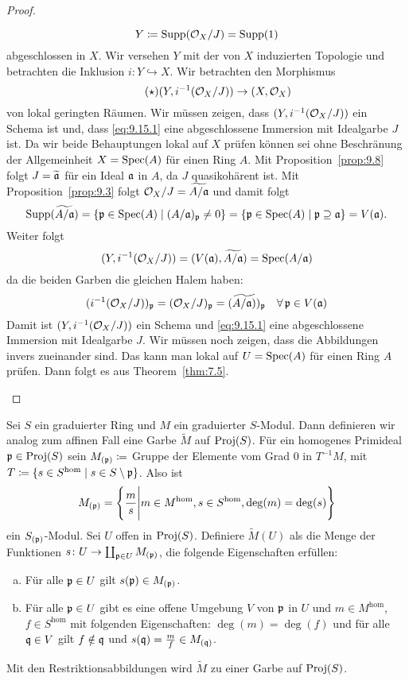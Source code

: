 \begin{prop}
\begin{proof}
\begin{enumerate}[i)]
 			\[
 				Y \coloneqq \operatorname{Supp}(\mathcal{O}_X/J) = \operatorname{Supp}(1)
 			\]
 			abgeschlossen in $X$. Wir versehen $Y$ mit der von $X$ induzierten Topologie und betrachten die Inklusion $i\colon Y \hookrightarrow X$. Wir betrachten den Morphismus
 			\[
 			\label{eq:9.15.1}\tag{$\star$}
 				(Y,i^{-1}(\mathcal{O}_X/J)) \to (X,\mathcal{O}_X)
 			\]
 			von lokal geringten Räumen. Wir müssen zeigen, dass $(Y,i^{-1}(\mathcal{O}_X/J))$ ein Schema ist und, dass \eqref{eq:9.15.1} eine abgeschlossene Immersion mit Idealgarbe $J$ ist. Da wir beide Behauptungen lokal auf $X$ prüfen können sei ohne Beschränung der Allgemeinheit $X = \operatorname{Spec}(A)$ für einen Ring $A$. Mit Proposition~\ref{prop:9.8} folgt $J = \widetilde{\mathfrak{a}}$ für ein Ideal $\mathfrak{a}$ in $A$, da $J$ quasikohärent ist. Mit Proposition~\ref{prop:9.3} folgt $\mathcal{O}_X/J = \widetilde{A/\mathfrak{a}}$ und damit folgt
 			\[
 				\operatorname{Supp}(\widetilde{A/\mathfrak{a}}) = \{\mathfrak{p} \in \operatorname{Spec}(A) \mid (A/\mathfrak{a})_{\mathfrak{p}} \neq 0\} = \{\mathfrak{p} \in \operatorname{Spec}(A) \mid \mathfrak{p} \supseteq \mathfrak{a}\} = V(\mathfrak{a}).
 			\]
 			Weiter folgt
 			\[
 				(Y,i^{-1}(\mathcal{O}_X/J)) = (V(\mathfrak{a}),\widetilde{A/\mathfrak{a}}) = \operatorname{Spec}(A/\mathfrak{a})
 			\]
 			da die beiden Garben die gleichen Halem haben:
 			\[
 				(i^{-1}(\mathcal{O}_X/J))_{\mathfrak{p}} = (\mathcal{O}_X/J)_{\mathfrak{p}} = (\widetilde{A/\mathfrak{a})})_{\mathfrak{p}}\quad \forall\, \mathfrak{p} \in V(\mathfrak{a})
 			\]
 			Damit ist $(Y,i^{-1}(\mathcal{O}_X/J))$ ein Schema und \eqref{eq:9.15.1} eine abgeschlossene Immersion mit Idealgarbe $J$. Wir müssen noch zeigen, dass die Abbildungen invers zueinander sind. Das kann man lokal auf $U=\operatorname{Spec}(A)$ für einen Ring $A$ prüfen. Dann folgt es aus Theorem~\ref{thm:7.5}.
 		\end{enumerate}
 	\end{proof}
\end{prop}

\begin{defn}
\label{defn:9.16}
	Sei $S$ ein graduierter Ring und $M$ ein graduierter $S$-Modul. Dann definieren wir analog zum affinen Fall eine Garbe $\widetilde{M}$ auf $\operatorname{Proj}(S)$. Für ein homogenes Primideal $\mathfrak{p} \in \operatorname{Proj}(S)$ sein $M_{(\mathfrak{p})}\coloneqq$ Gruppe der Elemente vom Grad $0$ in $T^{-1}M$, mit $T\coloneqq \{s \in S^\text{hom}\mid s \in S \setminus \mathfrak{p}\}$. Also ist
	\[
		M_{(\mathfrak{p})} = \Bigg\lbrace \frac{m}{s} \Bigg\vert m \in M^{\text{hom}}, s \in S^{\text{hom}}, \deg(m) = \deg(s) \Bigg\rbrace
	\]
	ein $S_{(\mathfrak{p})}$-Modul. Sei $U$ offen in $\operatorname{Proj}(S)$. Definiere $\widetilde{M}(U)$ als die Menge der Funktionen $s\colon U \to \coprod_{\mathfrak{p} \in U}M_{(\mathfrak{p})}$, die folgende Eigenschaften erfüllen:
	\begin{enumerate}[a)]
		\item Für alle $\mathfrak{p} \in U$ gilt $s(\mathfrak{p}) \in M_{(\mathfrak{p})}$.
		\item Für alle $\mathfrak{p} \in U$ gibt es eine offene Umgebung $V$ von $\mathfrak{p}$ in $U$ und $m \in M^{\text{hom}}$, $f\in S^{\text{hom}}$ mit folgenden Eigenschaften: $\deg(m)=\deg(f)$ und für alle $\mathfrak{q} \in V$ gilt $f \notin \mathfrak{q}$ und $s(\mathfrak{q}) =  \frac{m}{f} \in M_{(\mathfrak{q})}$.
	\end{enumerate}
	Mit den Restriktionsabbildungen wird $\widetilde{M}$ zu einer Garbe auf $\operatorname{Proj}(S)$.
\end{defn}

